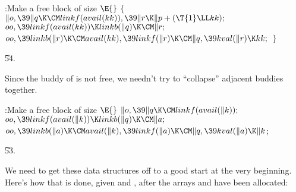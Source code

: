 \B{}:Make  a free block of
size \X${}\E{}$\6
${}\{{}$\1\6
${}\|o,\39\|q\K\CM\\{linkf}(\\{avail}(\\{kk})),\39\|r\K\|p+(\T{1}\LL\\{kk});{}$%
\6
${}\\{oo},\39\\{linkf}(\\{avail}(\\{kk}))\K\\{linkb}(\|q)\K\CM\|r;{}$\6
${}\\{oo},\39\\{linkb}(\|r)\K\CM\\{avail}(\\{kk}),\39\\{linkf}(\|r)\K\CM\|q,\39%
\\{kval}(\|r)\K\\{kk};{}$\6
\4${}\}{}$\2\par
\U54.\fi

Since the buddy of  is not free, we needn't try to
``collapse'' adjacent
buddies together.

\Y\B\4:Make  a free block of size \X${}\E{}$\6
$\|o,\39\|q\K\CM\\{linkf}(\\{avail}(\|k));{}$\6
${}\\{oo},\39\\{linkf}(\\{avail}(\|k))\K\\{linkb}(\|q)\K\CM\|a;{}$\6
${}\\{oo},\39\\{linkb}(\|a)\K\CM\\{avail}(\|k),\39\\{linkf}(\|a)\K\CM\|q,\39%
\\{kval}(\|a)\K\|k{}$;\par
\U53.\fi

We need to get these data structures off to a good start at
the very
beginning. Here's how that is done, given  and ,
after the arrays  and  have been allocated:

